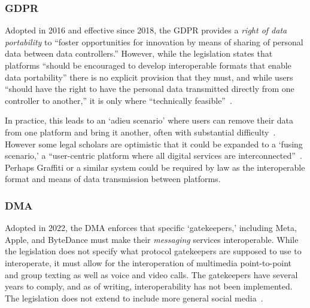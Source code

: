 \subsubsection{GDPR} Adopted in 2016 and effective since 2018, the GDPR provides a \emph{right of data portability}
to ``foster opportunities for innovation by means of sharing of personal data between data controllers.''
However, while the legislation states that platforms ``should be encouraged to develop interoperable formats that enable data portability'' there is no explicit provision that they must, and while users ``should have the right to have the personal data transmitted directly from one controller to another,'' it is only where ``technically feasible''~\cite{gdpr,gdprinteroperability}.

In practice, this leads to an `adieu scenario' where users can remove their data from one platform and bring it another, often with substantial difficulty~\cite{howportable}. However some legal scholars are optimistic that it could be expanded to a `fusing scenario,' a ``user-centric platform where all digital services are interconnected''~\cite{gdprinteroperability}.
Perhaps Graffiti or a similar system could be required by law as the interoperable format and means of data transmission between platforms.

\subsubsection{DMA} Adopted in 2022, the DMA enforces that specific `gatekeepers,' including Meta, Apple, and ByteDance must make their \emph{messaging} services interoperable.
While the legislation does not specify what protocol gatekeepers are supposed to use to interoperate, it must allow for the interoperation of multimedia point-to-point and group texting as well as voice and video calls.
The gatekeepers have several years to comply, and as of writing, interoperability has not been implemented.
The legislation does not extend to include more general social media~\cite{digitalmarketsact}.



